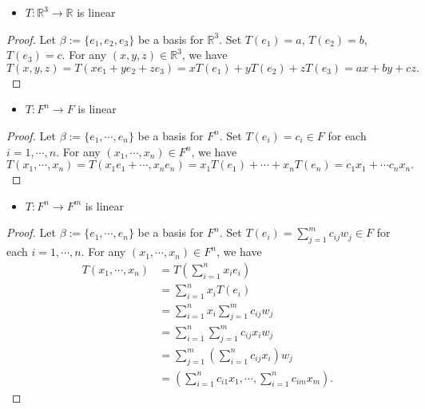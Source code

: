 \begin{Exercise}
	\begin{itemize}
		\item $T:\mathbb{R}^3\to\mathbb{R}$ is linear
	\end{itemize}
	\begin{proof}
		Let $\beta := \{e_1, e_2, e_3\}$ be a basis for $\mathbb{R}^3$.
		Set $T(e_1) = a$, $T(e_2) = b$, $T(e_3) = c$.
		For any $(x,y,z)\in\mathbb{R}^3$, we have
		$$
		T(x,y,z) 
		= T(x e_1+y e_2+z e_3) 
		= x T(e_1)+y T(e_2)+ z T(e_3)
		= a x+b y+c z.
		$$
	\end{proof}
	
	\begin{itemize}
		\item $T:F^n\to F$ is linear
	\end{itemize}
	\begin{proof}
		Let $\beta := \{e_1, \cdots, e_n\}$ be a basis for $F^n$.
		Set $T(e_i) = c_i\in F$ for each $i=1,\cdots,n$.
		For any $(x_1,\cdots,x_n)\in F^n$, we have
		$$
		T(x_1, \cdots, x_n)
		= T(x_1 e_1+\cdots, x_n e_n)
		= x_1 T(e_1)+\cdots+x_n T(e_n)
		= c_1 x_1 + \cdots c_n x_n.
		$$
	\end{proof}
	
	\begin{itemize}
		\item $T:F^n\to F^m$ is linear
	\end{itemize}
	\begin{proof}
		Let $\beta := \{e_1, \cdots, e_n\}$ be a basis for $F^n$.
		Set $T(e_i) = \sum_{j=1}^{m} c_{i j} w_j\in F$ for each $i=1,\cdots,n$.
		For any $(x_1,\cdots,x_n)\in F^n$, we have
		\begin{align*}
		T(x_1,\cdots, x_n)
		&= T\left( \sum_{i=1}^{n} x_i e_i \right) \\
		&= \sum_{i=1}^{n} x_i T(e_i) \\
		&= \sum_{i=1}^{n} x_i \sum_{j=1}^{m} c_{i j} w_j \\
		&= \sum_{i=1}^{n} \sum_{j=1}^{m} c_{i j} x_i w_j \\
		&= \sum_{j=1}^{m} \left( \sum_{i=1}^{n} c_{i j} x_i \right) w_j \\
		&= (\sum_{i=1}^{n} c_{i 1} x_1, \cdots, \sum_{i=1}^{n} c_{i m} x_m).
		\end{align*}
	\end{proof}
\end{Exercise}